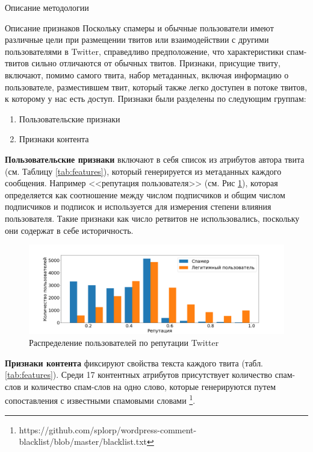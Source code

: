 \begin{section}{Описание методологии}
  \begin{subsection}{Описание признаков}
    Поскольку спамеры и обычные пользователи имеют различные цели при размещении твитов или взаимодействии с другими пользователями в Twitter, справедливо предположение, что характеристики спам-твитов сильно отличаются от обычных твитов.
    Признаки, присущие твиту, включают, помимо самого твита, набор метаданных, включая информацию о пользователе, разместившем твит, который также легко доступен в потоке твитов, к которому у нас есть доступ.
    Признаки были разделены по следующим группам:
    \begin{enumerate}
      \item Пользовательские признаки
      \item Признаки контента
    \end{enumerate}

    \textbf{Пользовательские признаки} включают в себя список из атрибутов автора твита (см. Таблицу \ref{tab:features}), который генерируется из метаданных каждого сообщения. Например <<репутация пользователя>> \cite{Wang} (см. Рис \ref{pic:reputation}), которая определяется как соотношение между числом подписчиков и общим числом подписчиков и подписок и используется для измерения степени влияния пользователя. Такие признаки как число ретвитов не использовались, поскольку они содержат в себе историчность.

    \begin{figure}[ht!]
    \centering
    \includegraphics[width=1.0\textwidth]{pics/reputation}
    \caption{Распределение пользователей по репутации Twitter}
    \label{pic:reputation}
    \end{figure}

    \textbf{Признаки контента} фиксируют свойства текста каждого твита (табл. \ref{tab:features}).
     Среди 17 контентных атрибутов присутствует количество спам-слов и количество спам-слов на одно слово, которые генерируются путем сопоставления с известными спамовыми словами \footnote{https://github.com/splorp/wordpress-comment-blacklist/blob/master/blacklist.txt}.



\end{subsection}
\end{section}
